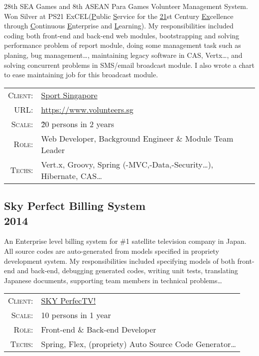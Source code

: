 \documentclass[a4paper,10pt]{article}
\begin{document}
28th SEA Games and 8th ASEAN Para Games Volunteer Management System.
Won Silver at PS21 ExCEL(\underline{P}ublic \underline{S}ervice for the \underline{21}st Century \underline{Ex}cellence through \underline{C}ontinuous \underline{E}nterprise and \underline{L}earning).
My responsibilities included coding both front-end and back-end web modules,
bootstrapping and solving performance problem of report module,
doing some management task such as planing, bug management\ldots,
maintaining legacy software in CAS, Vertx\ldots,
and solving concurrent problems in SMS/email broadcast module.
I also wrote a chart to ease maintaining job for this broadcast module.

\begin{tabular}{rl}
    \textsc{Client:} & \href{http://www.sportsingapore.gov.sg/}{Sport Singapore}\\
    \textsc{URL:} & \url{https://www.volunteers.sg}\\
    \textsc{Scale:} & \~20 persons in 2 years\\
    \textsc{Role:} & Web Developer, Background Engineer \& Module Team Leader\\
    \textsc{Techs:} & Vert.x, Groovy, Spring (-MVC,-Data,-Security\ldots), Hibernate, CAS\ldots\\
\end{tabular}


\subsection*{Sky Perfect Billing System\\\small 2014}

An Enterprise level billing system for \#1 satellite television company in Japan.
All source codes are auto-generated from models specified in propriety development system.
My responsibilities included specifying models of both front-end and back-end, debugging generated codes, writing unit tests,
translating Japanese documents, supporting team members in technical problems\ldots

\begin{tabular}{rl}
    \textsc{Client:} & \href{https://www.skyperfectv.co.jp/eng/}{SKY PerfecTV!}\\
    \textsc{Scale:} & 10 persons in 1 year\\
    \textsc{Role:} & Front-end \& Back-end Developer\\
    \textsc{Techs:} & Spring, Flex, (propriety) Auto Source Code Generator\ldots\\
\end{tabular}
\end{document}
